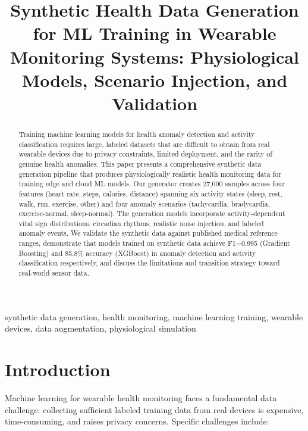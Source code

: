 \documentclass[conference]{IEEEtran}
\begin{document}
\title{Synthetic Health Data Generation for ML Training in Wearable Monitoring Systems: Physiological Models, Scenario Injection, and Validation}

\author{
}

\maketitle

\begin{abstract}
Training machine learning models for health anomaly detection and activity classification requires large, labeled datasets that are difficult to obtain from real wearable devices due to privacy constraints, limited deployment, and the rarity of genuine health anomalies. This paper presents a comprehensive synthetic data generation pipeline that produces physiologically realistic health monitoring data for training edge and cloud ML models. Our generator creates 27,000 samples across four features (heart rate, steps, calories, distance) spanning six activity states (sleep, rest, walk, run, exercise, other) and four anomaly scenarios (tachycardia, bradycardia, exercise-normal, sleep-normal). The generation models incorporate activity-dependent vital sign distributions, circadian rhythms, realistic noise injection, and labeled anomaly events. We validate the synthetic data against published medical reference ranges, demonstrate that models trained on synthetic data achieve F1=0.995 (Gradient Boosting) and 85.8\% accuracy (XGBoost) in anomaly detection and activity classification respectively, and discuss the limitations and transition strategy toward real-world sensor data.
\end{abstract}

\begin{IEEEkeywords}
synthetic data generation, health monitoring, machine learning training, wearable devices, data augmentation, physiological simulation
\end{IEEEkeywords}

\section{Introduction}
Machine learning for wearable health monitoring faces a fundamental data challenge: collecting sufficient labeled training data from real devices is expensive, time-consuming, and raises privacy concerns. Specific challenges include:
\end{document}
